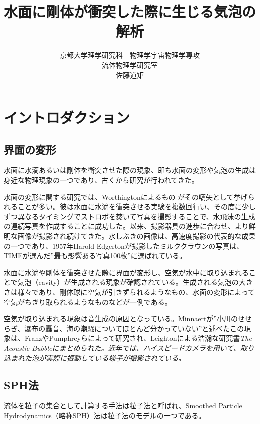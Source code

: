 \documentclass[]{jsarticle}
\begin{document}
\title{水面に剛体が衝突した際に生じる気泡の解析}
\author{京都大学理学研究科　物理学宇宙物理学専攻\\流体物理学研究室\\佐藤道矩}
\maketitle
\newpage

\tableofcontents
\newpage
\section{イントロダクション}
\subsection{界面の変形}
水面に水滴あるいは剛体を衝突させた際の現象、即ち水面の変形や気泡の生成は身近な物理現象の一つであり、古くから研究が行われてきた。

水面の変形に関する研究では、Worthingtonによるもの \cite{Worthington1908}がその嚆矢として挙げられることが多い。彼は水面に水滴を衝突させる実験を複数回行い、その度に少しずつ異なるタイミングでストロボを焚いて写真を撮影することで、水飛沫の生成の連続写真を作成することに成功した。以来、撮影器具の進歩に合わせ、より鮮明な画像が撮影され続けてきた。水しぶきの画像は、高速度撮影の代表的な成果の一つであり、1957年Harold Edgertonが撮影したミルククラウンの写真は、TIMEが選んだ”最も影響ある写真100枚”に選ばれている。

水面に水滴や剛体を衝突させた際に界面が変形し、空気が水中に取り込まれることで気泡（cavity）が生成される現象が確認されている。生成される気泡の大きさは様々であり、剛体球に空気が引きずられるようなもの\cite{Worthington1908}\cite{Mallock1918}、水面の変形によって空気がちぎり取られるようなもの\cite{Oguz1990}などが一例である。

空気が取り込まれる現象は音生成の原因となっている。Minnaert\cite{minnaert1933xvi}が”小川のせせらぎ、瀑布の轟音、海の潮騒についてほとんど分かっていない”と述べたこの現象は、Franz\cite{Franz1959}やPumphrey\cite{Pumphrey1990}らによって研究され、Leightonによる浩瀚な研究書\it{The Acoustic Bubble}\cite{leightonacoustic}にまとめられた。近年では、ハイスピードカメラを用いて、取り込まれた泡が実際に振動している様子が撮影されている\cite{Phillips2018}。

\subsection{SPH法}
流体を粒子の集合として計算する手法は粒子法と呼ばれ、\rm{Smoothed Particle Hydrodynamics}（略称SPH）法は粒子法のモデルの一つである。
\end{document}
